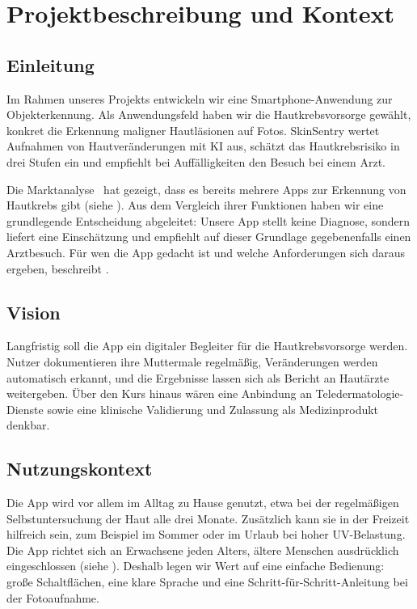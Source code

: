 \section{Projektbeschreibung und Kontext}
\label{chap:projekt}

\subsection{Einleitung}

Im Rahmen unseres Projekts entwickeln wir eine Smartphone-Anwendung zur Objekterkennung. Als Anwendungsfeld haben wir die Hautkrebsvorsorge gewählt, konkret die Erkennung maligner Hautläsionen auf Fotos. SkinSentry wertet Aufnahmen von Hautveränderungen mit KI aus, schätzt das Hautkrebsrisiko in drei Stufen ein und empfiehlt bei Auffälligkeiten den Besuch bei einem Arzt.

Die Marktanalyse~\cite{marktanalyse2026} hat gezeigt, dass es bereits mehrere Apps zur Erkennung von Hautkrebs gibt (siehe ). Aus dem Vergleich ihrer Funktionen haben wir eine grundlegende Entscheidung abgeleitet: Unsere App stellt keine Diagnose, sondern liefert eine Einschätzung und empfiehlt auf dieser Grundlage gegebenenfalls einen Arztbesuch. Für wen die App gedacht ist und welche Anforderungen sich daraus ergeben, beschreibt .

\subsection{Vision}

Langfristig soll die App ein digitaler Begleiter für die Hautkrebsvorsorge werden. Nutzer dokumentieren ihre Muttermale regelmäßig, Veränderungen werden automatisch erkannt, und die Ergebnisse lassen sich als Bericht an Hautärzte weitergeben. Über den Kurs hinaus wären eine Anbindung an Teledermatologie-Dienste sowie eine klinische Validierung und Zulassung als Medizinprodukt denkbar.

\subsection{Nutzungskontext}

Die App wird vor allem im Alltag zu Hause genutzt, etwa bei der regelmäßigen Selbstuntersuchung der Haut alle drei Monate. Zusätzlich kann sie in der Freizeit hilfreich sein, zum Beispiel im Sommer oder im Urlaub bei hoher UV-Belastung. Die App richtet sich an Erwachsene jeden Alters, ältere Menschen ausdrücklich eingeschlossen (siehe ). Deshalb legen wir Wert auf eine einfache Bedienung: große Schaltflächen, eine klare Sprache und eine Schritt-für-Schritt-Anleitung bei der Fotoaufnahme.

